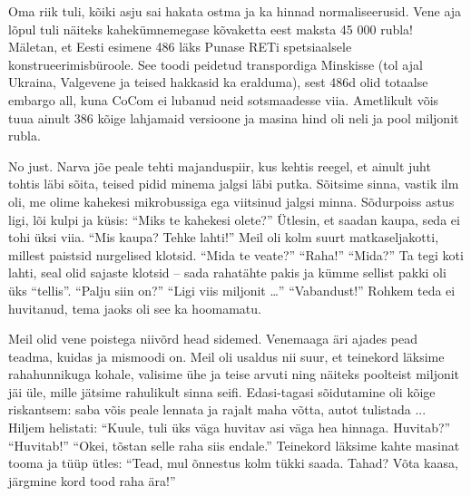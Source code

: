 
Oma riik tuli, kõiki asju sai hakata ostma ja ka hinnad normaliseerusid. Vene 
aja lõpul tuli näiteks kahekümnemegase kõvaketta eest
maksta 45 000 rubla! Mäletan, et Eesti esimene 486 läks Punase 
RETi spetsiaalsele konstrueerimisbüroole. See toodi peidetud transpordiga Minskisse (tol ajal Ukraina, Valgevene ja teised hakkasid ka 
eralduma), sest 486d olid totaalse embargo all, kuna 
CoCom ei lubanud neid sotsmaadesse 
viia. Ametlikult võis tuua ainult 386 kõige lahjamaid versioone ja masina hind oli neli ja pool miljonit rubla.


No just. Narva jõe peale tehti majanduspiir, kus kehtis reegel, et ainult juht tohtis läbi sõita, teised pidid minema jalgsi läbi putka. Sõitsime sinna, vastik 
ilm oli, me olime kahekesi mikrobussiga ega viitsinud jalgsi minna. Sõdurpoiss astus ligi, lõi kulpi ja küsis: \enquote{Miks te kahekesi 
olete?} Ütlesin, et saadan kaupa, seda ei tohi üksi viia. \enquote{Mis kaupa? 
Tehke lahti!} Meil oli kolm suurt matkaseljakotti, millest paistsid nurgelised 
klotsid. \enquote{Mida te veate?} \enquote{Raha!} \enquote{Mida?} Ta tegi
koti lahti, seal olid sajaste klotsid -- sada rahatähte pakis ja kümme sellist pakki oli üks \enquote{tellis}. \enquote{Palju 
siin on?} \enquote{Ligi viis miljonit \ldots} \enquote{Vabandust!} Rohkem teda
ei huvitanud, tema jaoks oli see ka hoomamatu. 

Meil olid vene poistega niivõrd head sidemed. Venemaaga äri ajades pead 
teadma, kuidas ja mismoodi on. Meil oli usaldus nii suur, et teinekord läksime rahahunnikuga kohale, 
valisime ühe ja teise arvuti ning
näiteks poolteist miljonit jäi üle, mille jätsime rahulikult sinna 
seifi. Edasi-tagasi sõidutamine oli kõige riskantsem: saba võis
peale lennata ja rajalt maha võtta, autot tulistada ... Hiljem 
helistati: \enquote{Kuule, tuli üks väga huvitav asi väga hea hinnaga. 
Huvitab?} \enquote{Huvitab!} \enquote{Okei, tõstan selle raha siis endale.} 
Teinekord läksime kahte masinat tooma ja tüüp ütles: \enquote{Tead, 
mul õnnestus kolm tükki saada. Tahad? Võta kaasa, järgmine kord tood raha 
ära!} 

